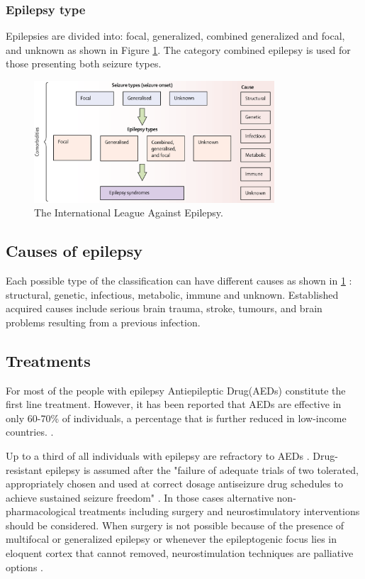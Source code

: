     \subsubsection*{Epilepsy type}
    Epilepsies are divided into: focal, generalized, combined generalized and focal, and unknown as shown in Figure \ref{fig:Classification of epilepsies}. The category combined epilepsy is used for those presenting both seizure types.

    \begin{figure}[h]
      \centering
      \includegraphics[width=0.8\textwidth]{images/epilepsyTypes.png}
      \caption{The International League Against Epilepsy.\cite{THIJS2019689, classification}}
      \label{fig:Classification of epilepsies}
    \end{figure}
  
  \subsection*{Causes of epilepsy}
  Each possible type of the classification can have different causes as shown in \ref{fig:Classification of epilepsies} : structural, genetic, infectious, metabolic, immune and unknown. Established acquired causes include serious brain trauma, stroke, tumours, and brain problems resulting from a previous infection. \cite{THIJS2019689, classification}

  \subsection*{Treatments}
  For most of the people with epilepsy Antiepileptic Drug(AEDs) constitute the first line treatment. However, it has been reported that AEDs are effective in only 60-70\% of individuals, a percentage that is further reduced in low-income countries. \cite{DUNCAN2006}.

  Up to a third of all individuals with epilepsy are refractory to AEDs \cite{SpencerHuh2008}. Drug-resistant epilepsy is assumed after the "failure of adequate trials of two tolerated, appropriately chosen and used at correct dosage antiseizure drug schedules to achieve sustained seizure freedom" \cite{drug_resist}. In those cases alternative non-pharmacological treatments including surgery and neurostimulatory interventions should be considered.
  When surgery is not possible because of the presence of multifocal or generalized epilepsy or whenever the epileptogenic focus lies in eloquent cortex that cannot removed, neurostimulation techniques are palliative options \cite{Englot2013}.

